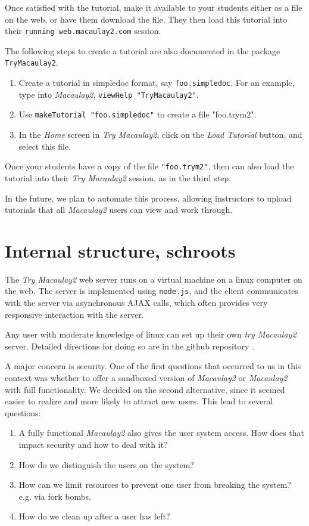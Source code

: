 \documentclass[]{article}
\def\tryM2{{\it Try Macaulay2}}
\def\M2{{\it Macaulay2}}
\begin{document}
Once satisfied with the tutorial, make it available to your students either as a file on the web,
or have them download the file.  They then load this tutorial into their {\tt running web.macaulay2.com} session.

The following steps to create a tutorial are also documented in the package {\tt TryMacaulay2}.
\begin{enumerate}
\item Create a tutorial in simpledoc format, say {\tt foo.simpledoc}.  For an example, type into \M2, {\tt viewHelp "TryMacaulay2"}.
\item Use {\tt makeTutorial "foo.simpledoc"} to create a file "foo.trym2".
\item In the {\it Home} screen in \tryM2, click on the {\it Load Tutorial} button, and select this file.
\end{enumerate}

Once your students have a copy of the file {\tt "foo.trym2"}, then can also load the tutorial into their \tryM2
session, as in the third step.

In the future, we plan to automate this process, allowing instructors to upload tutorials that all \M2 users 
can view and work through.

\section{Internal structure, schroots}

The \tryM2 web server runs on a virtual machine on a linux computer on the web.
The server is implemented using {\tt node.js}, and the client
communicates with the server via asynchronous AJAX calls, which often
provides very responsive interaction with the server.

Any user with moderate knowledge of linux can set up their own {\it try Macaulay2}
server.  Detailed directions for doing so are in the github repository \cite{github}.

A major concern is security.
One of the first questions that occurred to us in this context was
whether to offer a sandboxed version of \M2 or \M2 with full
functionality.
We decided on the second alternative, since it seemed
easier to realize and more likely to attract new users.  This lead to
several questions:

\begin{enumerate}
\item A fully functional \M2 also gives the user system access. How does that impact security and how to deal with it?
\item How do we distinguish the users on the system?
\item How can we limit resources to prevent one user from breaking the system? e.g. via fork bombs.
\item How do we clean up after a user has left?
\end{enumerate}
\end{document}
